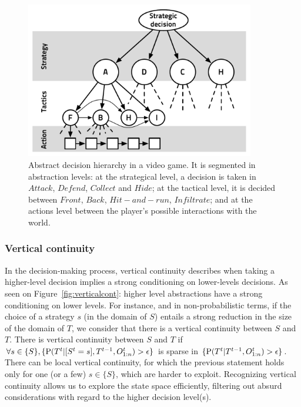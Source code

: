 \begin{figure}
\begin{center}
\includegraphics[width=10cm]{images/basic_abstract_decision_hierarchy3.pdf}
\end{center}
\caption{Abstract decision hierarchy in a video game. It is segmented in abstraction levels: at the strategical level, a decision is taken in $Attack$, $Defend$, $Collect$ and $Hide$; at the tactical level, it is decided between $Front$, $Back$, $Hit-and-run$, $Infiltrate$; and at the actions level between the player's possible interactions with the world.}
\label{fig:abstractdecisionhierarchy}
\end{figure}

\subsubsection{Vertical continuity}
In the decision-making process, vertical continuity describes when taking a higher-level decision implies a strong conditioning on lower-levels decisions. As seen on Figure~\ref{fig:verticalcont}: higher level abstractions have a strong conditioning on lower levels. For instance, and in non-probabilistic terms, if the choice of a strategy $s$ (in the domain of $S$) entails a strong reduction in the size of the domain of $T$, we consider that there is a vertical continuity between $S$ and $T$. There is vertical continuity between $S$ and $T$ if $\forall s \in \{S\}, \{\mathrm{P}(T^t|[S^t=s], T^{t-1}, O_{1:n}^t) > \epsilon\}$ is sparse in $\{\mathrm{P}(T^t|T^{t-1}, O_{1:n}^t) > \epsilon\}$. There can be local vertical continuity, for which the previous statement holds only for one (or a few) $s \in \{S\}$, which are harder to exploit. Recognizing vertical continuity allows us to explore the state space efficiently, filtering out absurd considerations with regard to the higher decision level(s).

